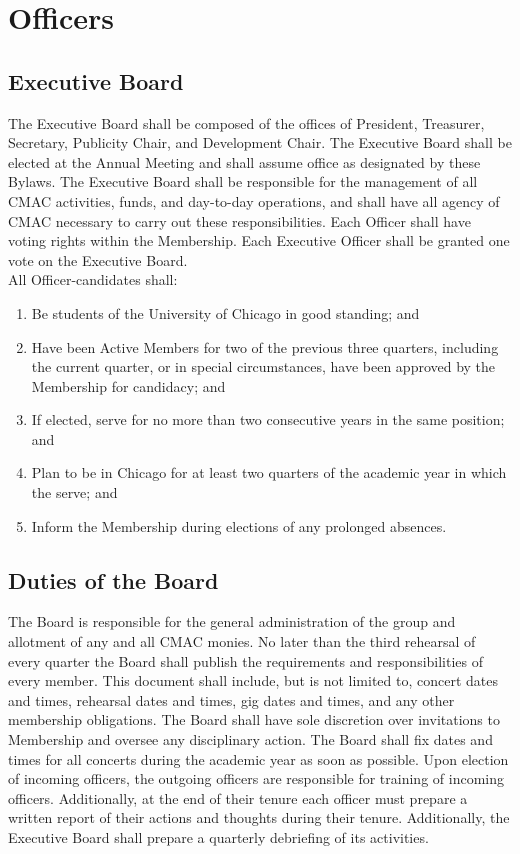 \documentclass{article}
\begin{document}
\section{Officers}

\subsection{Executive Board}

The Executive Board shall be composed of the offices of President,
Treasurer, Secretary, Publicity Chair, and Development Chair. The
Executive Board shall be elected at the Annual Meeting and shall assume
office as designated by these Bylaws. The Executive Board shall be
responsible for the management of all CMAC activities, funds, and
day-to-day operations, and shall have all agency of CMAC necessary
to carry out these responsibilities. Each Officer shall have voting
rights within the Membership. Each Executive Officer shall be granted
one vote on the Executive Board. \\
 All Officer-candidates shall:
\begin{enumerate}
\item Be students of the University of Chicago in good standing;
and
\item Have been Active Members for two of the previous three quarters, including
the current quarter, or in special circumstances, have been approved
by the Membership for candidacy; and
\item If elected, serve for no more than two consecutive years in the same
position; and
\item Plan to be in Chicago for at least two quarters of the academic year
in which the serve; and
\item Inform the Membership during elections of any prolonged absences.
\end{enumerate}

\subsection{Duties of the Board}

The Board is responsible for the general administration of the group
and allotment of any and all CMAC monies. No later than the third
rehearsal of every quarter the Board shall publish the requirements
and responsibilities of every member. This document shall include,
but is not limited to, concert dates and times, rehearsal dates and
times, gig dates and times, and any other membership obligations.
The Board shall have sole discretion over invitations to Membership
and oversee any disciplinary action. The Board shall fix dates and
times for all concerts during the academic year as soon as possible.
Upon election of incoming officers, the outgoing officers are responsible
for training of incoming officers. Additionally, at the end of their
tenure each officer must prepare a written report of their actions
and thoughts during their tenure. Additionally, the Executive Board
shall prepare a quarterly debriefing of its activities.
\end{document}
